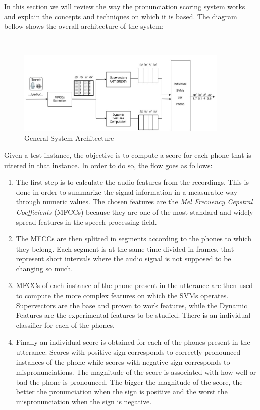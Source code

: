 In this section we will review the way the pronunciation scoring system works
and explain the concepts and techniques on which it is based. The diagram bellow
shows the overall architecture of the system:

~

\begin{figure}[H]
	\centering
	\includegraphics[width=0.9\textwidth]{files/figures/method/general-structure-v2.jpg}
	\caption{General System Architecture}
	\label{fig:methodGeneralArchitecture}
\end{figure}

Given a test instance, the objective is to compute a score for each phone that
is uttered in that instance. In order to do so, the flow goes as follows:

\begin{enumerate}

 \item The first step is to calculate the audio features from the recordings.
 This is done in order to summarize the signal information
 in a measurable way through numeric values. The chosen features
 are the \textit{Mel Frecuency Cepstral Coefficients} (MFCCs) because they are one of the
 most standard and widely-spread features in the speech processing field.

 \item The MFCCs are then splitted in segments according to the phones to which they
 belong. Each segment is at the same time divided in frames, that represent short
 intervals where the audio signal is not supposed to be changing so much.

 \item MFCCs of each instance of the phone present in the utterance
 are then used to compute the more complex features
 on which the SVMs operates. Supervectors are the base and proven to work features,
 while the Dynamic Features are the experimental features to be studied.
 There is an individual classifier for each of the phones.

 \item Finally an individual score is obtained for each of the phones present in the
 utterance. Scores with positive sign corresponds to correctly pronounced instances of the phone
 while scores with negative sign corresponds to mispronunciations. The magnitude of the score
 is associated with how well or bad the phone is pronounced.
 The bigger the magnitude of the score, the better the pronunciation when the sign is positive
 and the worst the mispronunciation when the sign is negative.

\end{enumerate}

